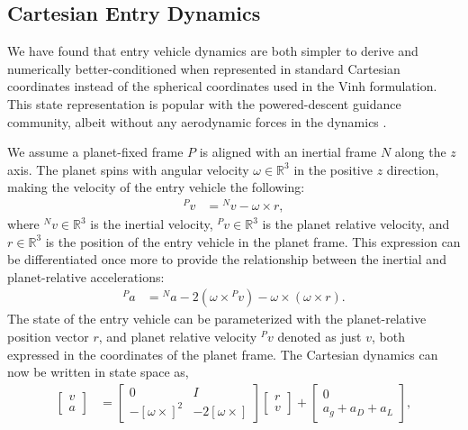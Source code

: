 \subsection{Cartesian Entry Dynamics}
We have found that entry vehicle dynamics are both simpler to derive and numerically better-conditioned when represented in standard Cartesian coordinates instead of the spherical coordinates used in the Vinh formulation. This state representation is popular with the powered-descent guidance community, albeit without any aerodynamic forces in the dynamics \cite{blackmore2012, acikmese2007, acikmese2013}.

We assume a planet-fixed frame $P$ is aligned with an inertial frame $N$ along the $z$ axis. The planet spins with angular velocity $\omega \in {\mathbb{R}}^3$ in the positive $z$ direction, making the velocity of the entry vehicle the following:
\begin{align}
{}^P v  &= {}^N v  -    \omega  \times r, \label{eq:pv}
\end{align}
where $^Nv \in {\mathbb{R}}^3$ is the inertial velocity, $^Pv \in {\mathbb{R}}^3$ is the planet relative velocity, and $r \in {\mathbb{R}}^3$ is the position of the entry vehicle in the planet frame. This expression can be differentiated once more to provide the relationship between the inertial and planet-relative accelerations:
\begin{align}
{}^P a &=   {}^{N} a -       2( \omega \times {}^P v )                          -   \omega  \times (\omega \times r) .\label{eq:Pa}
\end{align}
The state of the entry vehicle can be parameterized with the planet-relative position vector $r$, and planet relative velocity ${}^P v$ denoted as just $v$, both expressed in the coordinates of the planet frame. The Cartesian dynamics can now be written in state space as,
\begin{align}
    {\begin{bmatrix} v \\ a \end{bmatrix}} &= \begin{bmatrix} 0 & I \\ -[\omega \times]^2 & -2[\omega \times] \end{bmatrix}\begin{bmatrix}r \\v  \end{bmatrix} + \begin{bmatrix} 0 \\  a_{g} + a_{D} + a_{L} \end{bmatrix},\label{eq:dynamics}
\end{align}
